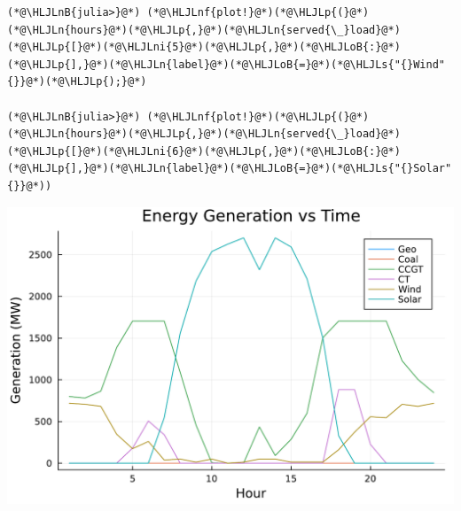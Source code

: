 \documentclass[12pt,a4paper]{article}
\newcommand{\HLJLn}[1]{#1}
\newcommand{\HLJLnf}[1]{\textcolor[RGB]{66,102,213}{#1}}
\newcommand{\HLJLs}[1]{\textcolor[RGB]{201,61,57}{#1}}
\newcommand{\HLJLnB}[1]{\textcolor[RGB]{59,151,46}{#1}}
\newcommand{\HLJLni}[1]{\textcolor[RGB]{59,151,46}{#1}}
\newcommand{\HLJLoB}[1]{\textcolor[RGB]{102,102,102}{\textbf{#1}}}
\newcommand{\HLJLp}[1]{#1}
\begin{document}
\begin{lstlisting}
(*@\HLJLnB{julia>}@*) (*@\HLJLnf{plot!}@*)(*@\HLJLp{(}@*)(*@\HLJLn{hours}@*)(*@\HLJLp{,}@*)(*@\HLJLn{served{\_}load}@*)(*@\HLJLp{[}@*)(*@\HLJLni{5}@*)(*@\HLJLp{,}@*)(*@\HLJLoB{:}@*)(*@\HLJLp{],}@*)(*@\HLJLn{label}@*)(*@\HLJLoB{=}@*)(*@\HLJLs{"{}Wind"{}}@*)(*@\HLJLp{);}@*)

(*@\HLJLnB{julia>}@*) (*@\HLJLnf{plot!}@*)(*@\HLJLp{(}@*)(*@\HLJLn{hours}@*)(*@\HLJLp{,}@*)(*@\HLJLn{served{\_}load}@*)(*@\HLJLp{[}@*)(*@\HLJLni{6}@*)(*@\HLJLp{,}@*)(*@\HLJLoB{:}@*)(*@\HLJLp{],}@*)(*@\HLJLn{label}@*)(*@\HLJLoB{=}@*)(*@\HLJLs{"{}Solar"{}}@*))
\end{lstlisting}
\includegraphics[width=\linewidth]{figures/as2752_hw3_8_1.pdf}
\end{document}

